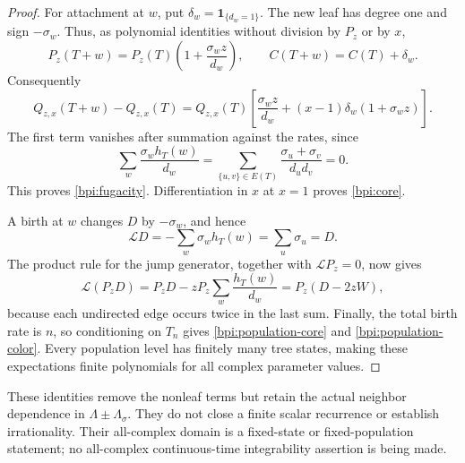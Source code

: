 \begin{proof}
For attachment at $w$, put $\delta_w=\mathbf1_{\{d_w=1\}}$.
The new leaf has degree one and sign $-\sigma_w$.  Thus, as polynomial
identities without division by $P_z$ or by $x$,
\[
 P_z(T+w)=P_z(T)\left(1+\frac{\sigma_wz}{d_w}\right),
 \qquad C(T+w)=C(T)+\delta_w.
\]
Consequently
\[
 Q_{z,x}(T+w)-Q_{z,x}(T)
 =Q_{z,x}(T)\left[
   \frac{\sigma_wz}{d_w}
   +(x-1)\delta_w(1+\sigma_wz)\right].
\]
The first term vanishes after summation against the rates, since
\[
 \sum_w\frac{\sigma_wh_T(w)}{d_w}
 =\sum_{\{u,v\}\in E(T)}
       \frac{\sigma_u+\sigma_v}{d_ud_v}=0.
\]
This proves \eqref{bpi:fugacity}.  Differentiation in $x$ at $x=1$
proves \eqref{bpi:core}.

A birth at $w$ changes $D$ by $-\sigma_w$, and hence
\[
 \mathcal LD=-\sum_w\sigma_wh_T(w)=\sum_u\sigma_u=D.
\]
The product rule for the jump generator, together with
$\mathcal LP_z=0$, now gives
\[
 \mathcal L(P_zD)
 =P_zD-zP_z\sum_w\frac{h_T(w)}{d_w}
 =P_z(D-2zW),
\]
because each undirected edge occurs twice in the last sum.
Finally, the total birth rate is $n$, so conditioning on $T_n$ gives
\eqref{bpi:population-core} and \eqref{bpi:population-color}.
Every population level has finitely many tree states, making these
expectations finite polynomials for all complex parameter values.
\end{proof}

These identities remove the nonleaf terms but retain the actual neighbor
dependence in $\Lambda\pm\Lambda_\sigma$.  They do not close a finite
scalar recurrence or establish irrationality.  Their all-complex domain
is a fixed-state or fixed-population statement; no all-complex
continuous-time integrability assertion is being made.
